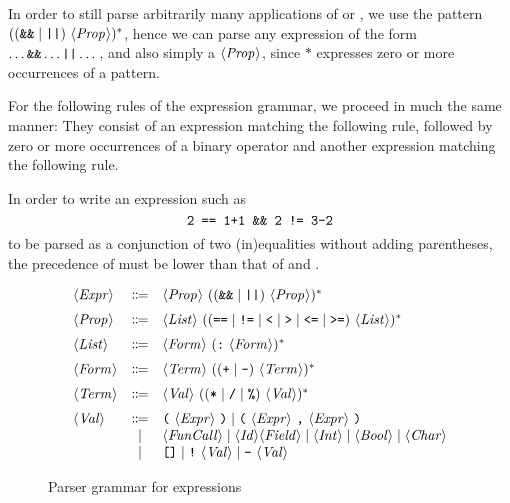 \documentclass{report}
\begin{document}
In order to still parse arbitrarily many applications of \code{\&\&} or
\code{||}, we use the pattern $((\texttt{\&\&} \mid \texttt{||})\ \langle \textit{Prop}\kern.7pt \rangle)^*$,
hence we can parse any expression of the form $\dots \texttt{\&\&} \dots \texttt{||} \dots$,
and also simply a $\langle \textit{Prop}\kern.7pt \rangle$, since $*$ expresses zero or more occurrences of
a pattern.

For the following rules of the expression grammar, we proceed in much the same
manner: They consist of an expression matching the following rule, followed
by zero or more occurrences of a binary operator and another expression matching
the following rule.


In order to write an
expression such as
\[ \texttt{2 == 1+1 \&\& 2 != 3-2} \]
to be parsed as a conjunction of two (in)equalities without adding parentheses,
the precedence of \code{\&\&} must be lower than that of \code{==} and \code{!=}.



\begin{figure}[ht]
  \[
  \begin{array}{lcl}
		\NT{Expr} & \Coloneqq & \NT{Prop}\ ((\code{\&\&} \mid \code{||})\ \NT{Prop})^* \br
		\NT{Prop} & \Coloneqq & \NT{List}\ ((\code{==} \mid \code{!=} \mid \code{<} \mid \code{>} \mid \code{<=} \mid \code{>=})\ \NT{List})^* \br
		\NT{List} & \Coloneqq & \NT{Form}\ (\code{:}\ \NT{Form})^* \br
		\NT{Form} & \Coloneqq & \NT{Term}\ (( \code{+} \mid \code{-} )\ \NT{Term})^* \br
		\NT{Term} & \Coloneqq & \NT{Val}\ (( \code{*} \mid \code{/} \mid \code{\%} )\ \NT{Val} )^* \br
		\NT{Val} & \Coloneqq & \code{(}\ \NT{Expr}\ \code{)} \mid \code{(}\ \NT{Expr}\ \code{,}\ \NT{Expr}\ \code{)} \\
		& \mid & \NT{FunCall} \mid \NT{Id} \NT{Field} \mid \NT{Int} \mid \NT{Bool} \mid \NT{Char} \\
		& \mid & \code{[]} \mid \code{!}\ \NT{Val} \mid \code{-}\ \NT{Val}
  \end{array}
  \]
  \caption{Parser grammar for expressions}
  \label{fig:refactored-grammar}
\end{figure}
\end{document}
